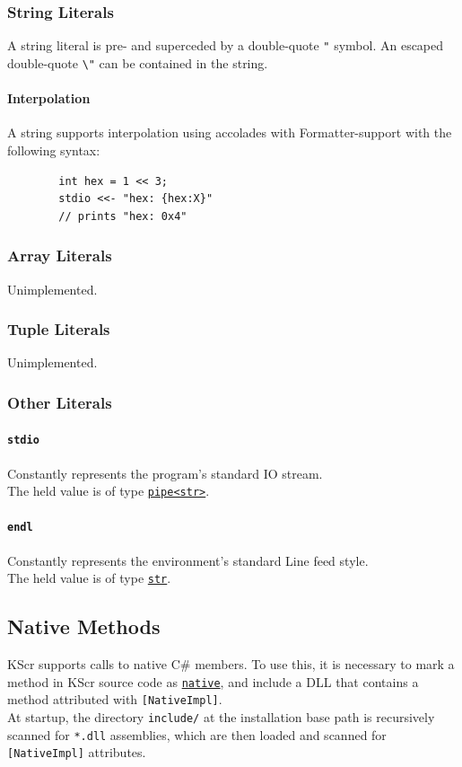 \documentclass{docs}
\begin{document}
    \label{litStr}
    \subsubsection{String Literals}
    A string literal is pre- and superceded by a double-quote \texttt{"} symbol.
    An escaped double-quote \texttt{\textbackslash"} can be contained in the string.
    
    \paragraph{Interpolation}
    A string supports interpolation using accolades with Formatter-support with the following syntax:
    \begin{verbatim}
        int hex = 1 << 3;
        stdio <<- "hex: {hex:X}"
        // prints "hex: 0x4"
    \end{verbatim}
    
    \label{litArray}
    \subsubsection{Array Literals}
    Unimplemented.
    
    \label{litTuple}
    \subsubsection{Tuple Literals}
    Unimplemented.
    
    \subsubsection{Other Literals}
    \label{litStdio}
    \paragraph{\texttt{stdio}}
    Constantly represents the program's standard IO stream. \\
    The held value is of type \hyperref[typePipe]{\texttt{pipe<str>}}.

    \label{litEndl}
    \paragraph{\texttt{endl}}
    Constantly represents the environment's standard Line feed style. \\
    The held value is of type \hyperref[typeStr]{\texttt{str}}.

    \subsection{Native Methods}
    KScr supports calls to native C\# members.
    To use this, it is necessary to mark a method in KScr source code as \hyperref[modNative]{\texttt{native}}, and include a DLL that contains a method attributed with \texttt{[NativeImpl]}.
    \\
    At startup, the directory \texttt{include/} at the installation base path is recursively scanned for \texttt{*.dll} assemblies, which are then loaded and scanned for \texttt{[NativeImpl]} attributes.
\end{document}
